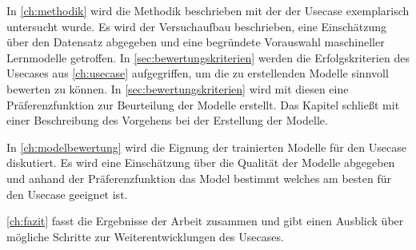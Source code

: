 In \cref{ch:methodik} wird die Methodik beschrieben mit der der Usecase exemplarisch untersucht wurde. Es wird der Versuchaufbau beschrieben, eine Einschätzung über den Datensatz abgegeben und eine begründete Vorauswahl maschineller Lernmodelle getroffen. In \cref{sec:bewertungskriterien} werden die Erfolgskriterien des Usecases aus \cref{ch:usecase} aufgegriffen, um die zu erstellenden Modelle sinnvoll bewerten zu können. In \cref{sec:bewertungskriterien} wird mit diesen eine Präferenzfunktion zur Beurteilung der Modelle erstellt. Das Kapitel schließt mit einer Beschreibung des Vorgehens bei der Erstellung der Modelle.

In \cref{ch:modelbewertung} wird die Eignung der trainierten Modelle für den Usecase diskutiert. Es wird eine Einschätzung über die Qualität der Modelle abgegeben und anhand der Präferenzfunktion das Model bestimmt welches am besten für den Usecase geeignet ist.

\cref{ch:fazit} fasst die Ergebnisse der Arbeit zusammen und gibt einen Ausblick über mögliche Schritte zur Weiterentwicklungen des Usecases.

